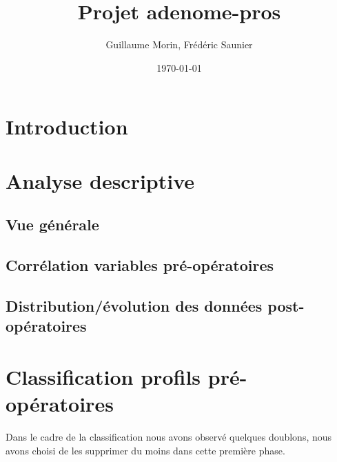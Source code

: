 \documentclass[12pt]{article}
\title{Projet  adenome-pros}
\author{Guillaume Morin, Frédéric Saunier}
\date{\today}
\begin{document}
\maketitle
\tableofcontents
\clearpage



\section{Introduction}

\newpage

\section{Analyse descriptive}

\subsection{Vue générale}
  

\subsection{Corrélation variables pré-opératoires}
  

\subsection{Distribution/évolution des données post-opératoires}
  
  
  
\newpage




\section{Classification profils pré-opératoires}

Dans le cadre de la classification nous avons observé quelques doublons, nous avons choisi de les supprimer 
du moins dans cette première phase. 
\end{document}
